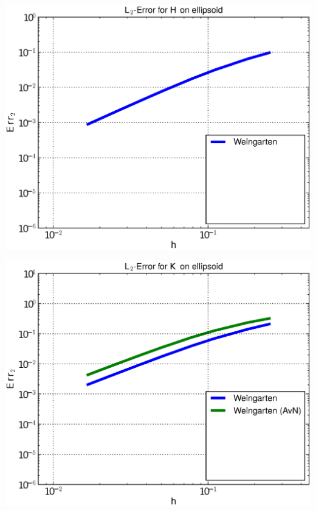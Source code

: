 \documentclass{beamer}
\begin{document}
\begin{frame}
\begin{overprint}
\begin{minipage}[t]{0.49\textwidth}
          \end{minipage}\hfill
          \begin{minipage}[t]{0.49\textwidth}
            \centering\includegraphics[width=\textwidth]{bilder/Curvature/heineC/ErrHL2_1.eps}
          \end{minipage}
          \begin{minipage}[t]{0.49\textwidth}
            \centering\includegraphics[width=\textwidth]{bilder/Curvature/heineC/ErrKL2_2.eps}
          \end{minipage}\hfill
          \begin{minipage}[t]{0.49\textwidth}

\end{minipage}
\end{overprint}
\end{frame}
\end{document}
